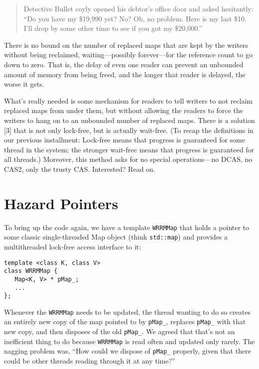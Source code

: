 \documentclass[a4paper,12pt,notitlepage,twoside,openright]{article}
\begin{document}
\begin{quote}
Detective Bullet coyly opened his debtor's office door and asked hesitantly: ``Do you have my \$19,990 yet? No? Oh, no problem. Here is my last \$10. I'll drop by some other time to see if you got my \$20,000.''
\end{quote}

There is no bound on the number of replaced maps that are kept by the writers without being reclaimed, waiting---possibly forever---for the reference count to go down to zero. That is, the delay of even one reader can prevent an unbounded amount of memory from being freed, and the longer that reader is delayed, the worse it gets.

What's really needed is some mechanism for readers to tell writers to not reclaim replaced maps from under them, but without allowing the readers to force the writers to hang on to an unbounded number of replaced maps. There is a solution [3] that is not only lock-free, but is actually wait-free. (To recap the definitions in our previous installment: Lock-free means that progress is guaranteed for some thread in the system; the stronger wait-free means that progress is guaranteed for all threads.) Moreover, this method asks for no special operations---no DCAS, no CAS2, only the trusty CAS. Interested? Read on.

\section{Hazard Pointers}

To bring up the code again, we have a template \texttt{WRRMMap} that holds a pointer to some classic single-threaded Map object (think \texttt{std::map}) and provides a multithreaded lock-free access interface to it:

\begin{verbatim}
template <class K, class V>
class WRRMMap {
   Map<K, V> * pMap_;
   ...
};
\end{verbatim}

Whenever the \texttt{WRRMMap} needs to be updated, the thread wanting to do so creates an entirely new copy of the map pointed to by \texttt{pMap\_}, replaces \texttt{pMap\_} with that new copy, and then disposes of the old \texttt{pMap\_}. We agreed that that's not an inefficient thing to do because \texttt{WRRMMap} is read often and updated only rarely. The nagging problem was, ``How could we dispose of \texttt{pMap\_} properly, given that there could be other threads reading through it at any time?''
\end{document}
